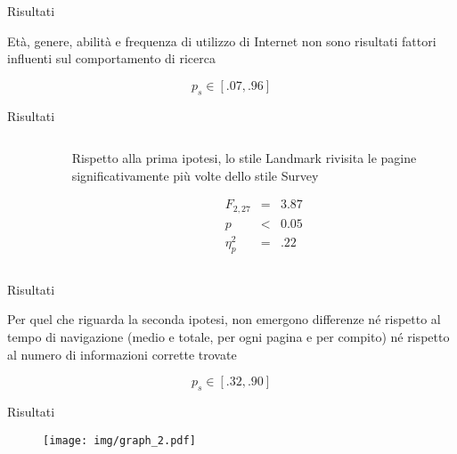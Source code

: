 


\begin{frame}[plain]{\alert{Risultati}}
\label{frm:risultati:1}


      Età, genere, abilità e frequenza di utilizzo di Internet non sono risultati fattori influenti
      sul comportamento di ricerca

      \begin{equation*}
        p_{s} \in \left[.07, .96 \right]
      \end{equation*}


\end{frame}

\begin{frame}[plain]{\alert{Risultati}}
  \label{frm:risultati:2}

  \begin{columns}

    \begin{column}{0.5\linewidth}
      \begin{figure}
         \label{fig:hist}
      \end{figure}
    \end{column}

    \begin{column}{0.5\textwidth}
      Rispetto alla prima ipotesi, lo stile Landmark rivisita le pagine significativamente più volte
      dello stile Survey%

      \begin{equation*}
        \begin{array}{rcl}
          F_{2,27} & = & 3.87         \\
          p & < & 0.05                \\
          \eta^{2}_{p} & = & .22
        \end{array}
      \end{equation*}
    \end{column}

  \end{columns}

\end{frame}


\begin{frame}[plain]{\alert{Risultati}}
  \label{frm:risultati:3}

  Per quel che riguarda la seconda ipotesi, non emergono differenze né rispetto al tempo di navigazione
  (medio e totale, per ogni pagina e per compito) né rispetto al numero di informazioni corrette trovate%

  \begin{equation*}
    p_{s} \in \left[.32, .90\right]
  \end{equation*}

\end{frame}

\begin{frame}[plain]{\alert{Risultati}}
\label{frm:risultati:4}

  \begin{figure}
    \texttt{[image: img/graph\_2.pdf]}
    \label{fig:graph_2}
  \end{figure}
\end{frame}
